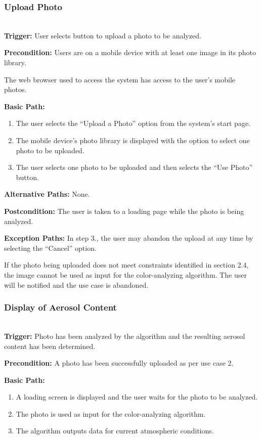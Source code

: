 \documentclass[letterpaper,10pt,draftclsnofoot,onecolumn]{IEEEtran}
\begin{document}
\begin{flushleft}
\subsubsection{Upload Photo} \ \\

\textbf{Trigger: } 
User selects button to upload a photo to be analyzed.

\textbf{Precondition: }
Users are on a mobile device with at least one image in its photo library.

The web browser used to access the system has access to the user’s mobile photos.

\textbf{Basic Path: }
\begin{enumerate}
	\item The user selects the “Upload a Photo” option from the system’s start page.
	\item The mobile device’s photo library is displayed with the option to select one photo to be uploaded.
	\item The user selects one photo to be uploaded and then selects the “Use Photo” button.
\end{enumerate}

\textbf{Alternative Paths: }
None.

\textbf{Postcondition: }
The user is taken to a loading page while the photo is being analyzed.

\textbf{Exception Paths: }
In step 3., the user may abandon the upload at any time by selecting the “Cancel” option.

If the photo being uploaded does not meet constraints identified in section 2.4, the image cannot be used as input for the color-analyzing algorithm. The user will be notified and the use case is abandoned.
\bigskip

\subsubsection{Display of Aerosol Content}  \ \\

\textbf{Trigger: } 
Photo has been analyzed by the algorithm and the resulting aerosol content has been determined.

\textbf{Precondition: }
A photo has been successfully uploaded as per use case 2.

\textbf{Basic Path: }
\begin{enumerate}
	\item A loading screen is displayed and the user waits for the photo to be analyzed.
	\item The photo is used as input for the color-analyzing algorithm.
	\item The algorithm outputs data for current atmospheric conditions.
\end{enumerate}


\end{flushleft}
\end{document}
